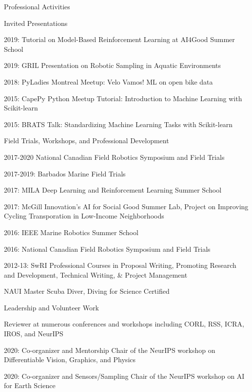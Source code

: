 \documentclass{resume} %
\begin{document}
\vspace{-.2cm}
\begin{rSection}{Professional Activities}
\begin{rSubsection}{Invited Presentations}{}{}{}
\item{2019: Tutorial on Model-Based Reinforcement Learning at AI4Good Summer School}
\item{2019: GRIL Presentation on Robotic Sampling in Aquatic Environments}	
\item{2018: PyLadies Montreal Meetup: Velo Vamos! ML on open bike data}
\item{2015: CapePy Python Meetup Tutorial: Introduction to Machine Learning with Scikit-learn }
\item{2015: BRATS Talk: Standardizing Machine Learning Tasks with Scikit-learn }
\end{rSubsection}
\newpage
\begin{rSubsection}{Field Trials, Workshops, and Professional Development}{}{}{}
\item{2017-2020 National Canadian Field Robotics Symposium and Field Trials}
\item{2017-2019: Barbados Marine Field Trials}
\item{2017: MILA Deep Learning and Reinforcement Learning Summer School}
\item{2017: McGill Innovation's AI for Social Good Summer Lab, Project on Improving Cycling Transporation in Low-Income Neighborhoods}
\item{2016: IEEE Marine Robotics Summer School}
\item{2016: National Canadian Field Robotics Symposium and Field Trials}
\item{2012-13: SwRI Professional Courses in Proposal Writing, Promoting Research and Development, Technical Writing, \& Project Management}
\item{NAUI Master Scuba Diver, Diving for Science Certified}
\end{rSubsection}
\vspace{-.2cm}
\begin{rSubsection}{Leadership and Volunteer Work}{}{}{}
\item{Reviewer at numerous conferences and workshops including CORL, RSS, ICRA, IROS, and NeurIPS}
\item{2020: Co-organizer and Mentorship Chair of the NeurIPS workshop on Differentiable Vision, Graphics, and Physics}
\item{2020: Co-organizer and Sensors/Sampling Chair of the NeurIPS workshop on AI for Earth Science}

\end{rSubsection}
\end{rSection}
\end{document}

